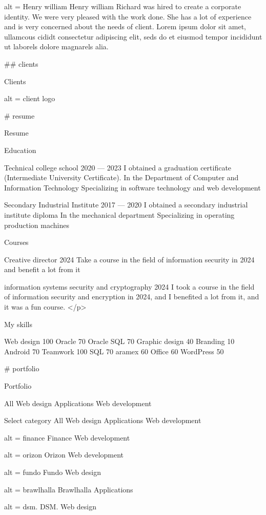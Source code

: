 alt = Henry william
Henry william
Richard was hired to create a corporate identity. We were very pleased with the work done. She has a lot of experience and is very concerned about the needs of client. Lorem ipsum dolor sit amet, ullamcous cididt consectetur adipiscing elit, seds do et eiusmod tempor incididunt ut laborels dolore magnarels alia.


## clients

Clients

alt = client logo



# resume

Resume

Education

Technical college school
2020 — 2023
I obtained a graduation certificate (Intermediate University Certificate).
In the Department of Computer and Information Technology
Specializing in software technology and web development


Secondary Industrial Institute
2017 — 2020
I obtained a secondary industrial institute diploma
In the mechanical department
Specializing in operating production machines

Courses

Creative director
2024
Take a course in the field of information security in 2024 and benefit a lot from it

information systems security and cryptography
2024
I took a course in the field of information security and encryption in 2024, and I benefited a lot from it, and it was a fun course.              </p>


My skills

Web design
100%
Oracle
70%
Oracle SQL
70%
Graphic design
40%
Branding
10%
Android
70%
Teamwork
100%
SQL
70%
aramex
60%
Office
60%
WordPress
50%



# portfolio

Portfolio

All
Web design
Applications
Web development

Select category
All
Web design
Applications
Web development

alt = finance
Finance
Web development

alt = orizon
Orizon
Web development

alt = fundo
Fundo
Web design

alt = brawlhalla
Brawlhalla
Applications

alt = dsm.
DSM.
Web design

